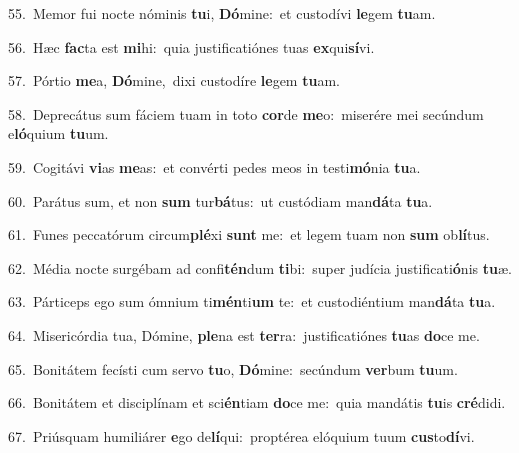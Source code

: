 {\numbfont\textcolor{\numbcolor}{55.}}~Memor fui nocte nóminis \textbf{tu}\-i, \textbf{Dó}\-mine:~\star et custodívi \textbf{le}\-gem \textbf{tu}\-am.\par
{\numbfont\textcolor{\numbcolor}{56.}}~Hæc \textbf{fac}\-ta est \textbf{mi}\-hi:~\star quia justificatiónes tuas \textbf{ex}\-qui\-\textbf{sí}\-vi.\par
{\numbfont\textcolor{\numbcolor}{57.}}~Pórtio \textbf{me}\-a, \textbf{Dó}\-mine,~\star dixi custodíre \textbf{le}\-gem \textbf{tu}\-am.\par
{\numbfont\textcolor{\numbcolor}{58.}}~Deprecátus sum fáciem tuam in toto \textbf{cor}\-de \textbf{me}\-o:~\star miserére mei secúndum e\-\textbf{ló}\-quium \textbf{tu}\-um.\par
{\numbfont\textcolor{\numbcolor}{59.}}~Cogitávi \textbf{vi}\-as \textbf{me}\-as:~\star et convérti pedes meos in testi\-\textbf{mó}\-nia \textbf{tu}\-a.\par
{\numbfont\textcolor{\numbcolor}{60.}}~Parátus sum, et non \textbf{sum} tur\-\textbf{bá}\-tus:~\star ut custódiam man\-\textbf{dá}\-ta \textbf{tu}\-a.\par
{\numbfont\textcolor{\numbcolor}{61.}}~Funes peccatórum circum\-\textbf{plé}\-xi \textbf{sunt} me:~\star et legem tuam non \textbf{sum} ob\-\textbf{lí}\-tus.\par
{\numbfont\textcolor{\numbcolor}{62.}}~Média nocte surgébam ad confi\-\textbf{tén}\-dum \textbf{ti}\-bi:~\star super judícia justificati\-\textbf{ó}\-nis \textbf{tu}\-æ.\par
{\numbfont\textcolor{\numbcolor}{63.}}~Párticeps ego sum ómnium ti\-\textbf{mén}\-ti\textbf{um} te:~\star et custodiéntium man\-\textbf{dá}\-ta \textbf{tu}\-a.\par
{\numbfont\textcolor{\numbcolor}{64.}}~Misericórdia tua, Dómine, \textbf{ple}\-na est \textbf{ter}\-ra:~\star justificatiónes \textbf{tu}\-as \textbf{do}\-ce me.\par
{\numbfont\textcolor{\numbcolor}{65.}}~Bonitátem fecísti cum servo \textbf{tu}\-o, \textbf{Dó}\-mine:~\star secúndum \textbf{ver}\-bum \textbf{tu}\-um.\par
{\numbfont\textcolor{\numbcolor}{66.}}~Bonitátem et disciplínam et sci\-\textbf{én}\-tiam \textbf{do}\-ce me:~\star quia mandátis \textbf{tu}\-is \textbf{cré}\-didi.\par
{\numbfont\textcolor{\numbcolor}{67.}}~Priúsquam humiliárer \textbf{e}\-go de\-\textbf{lí}\-qui:~\star proptérea elóquium tuum \textbf{cus}\-to\-\textbf{dí}\-vi.\par
